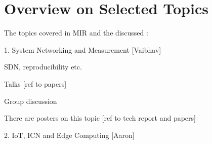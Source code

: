 \section{Overview on Selected Topics} \label{sec:content}

The topics covered in MIR and the discussed : 

1. System Networking and Measurement [Vaibhav]

SDN, reproducibility etc.

Talks [ref to papers]

Group discussion

There are posters on this topic [ref to tech report and papers]


2. IoT, ICN and Edge Computing [Aaron]

